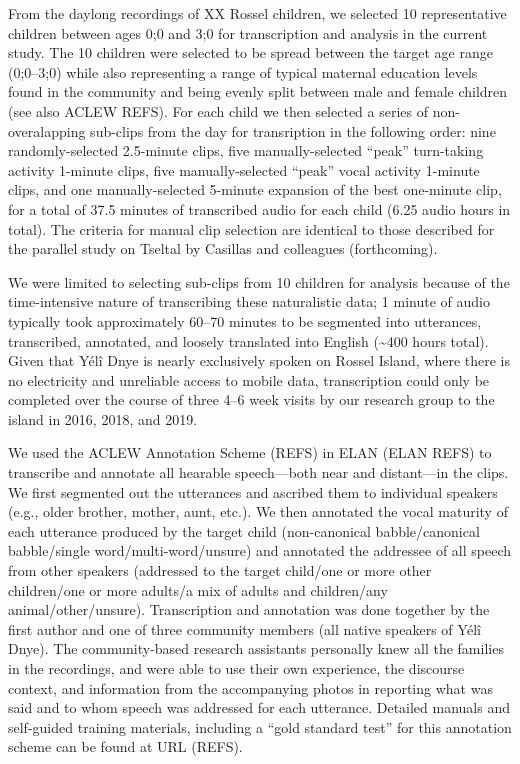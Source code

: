 \documentclass[,man,floatsintext]{apa6}
\begin{document}
From the daylong recordings of XX Rossel children, we selected 10
representative children between ages 0;0 and 3;0 for transcription and
analysis in the current study. The 10 children were selected to be
spread between the target age range (0;0--3;0) while also representing a
range of typical maternal education levels found in the community and
being evenly split between male and female children (see also ACLEW
REFS). For each child we then selected a series of non-overalapping
sub-clips from the day for transription in the following order: nine
randomly-selected 2.5-minute clips, five manually-selected
\enquote{peak} turn-taking activity 1-minute clips, five
manually-selected \enquote{peak} vocal activity 1-minute clips, and one
manually-selected 5-minute expansion of the best one-minute clip, for a
total of 37.5 minutes of transcribed audio for each child (6.25 audio
hours in total). The criteria for manual clip selection are identical to
those described for the parallel study on Tseltal by Casillas and
colleagues (forthcoming).

We were limited to selecting sub-clips from 10 children for analysis
because of the time-intensive nature of transcribing these naturalistic
data; 1 minute of audio typically took approximately 60--70 minutes to
be segmented into utterances, transcribed, annotated, and loosely
translated into English (\textasciitilde{}400 hours total). Given that
Yélî Dnye is nearly exclusively spoken on Rossel Island, where there is
no electricity and unreliable access to mobile data, transcription could
only be completed over the course of three 4--6 week visits by our
research group to the island in 2016, 2018, and 2019.

We used the ACLEW Annotation Scheme (REFS) in ELAN (ELAN REFS) to
transcribe and annotate all hearable speech---both near and distant---in
the clips. We first segmented out the utterances and ascribed them to
individual speakers (e.g., older brother, mother, aunt, etc.). We then
annotated the vocal maturity of each utterance produced by the target
child (non-canonical babble/canonical babble/single
word/multi-word/unsure) and annotated the addressee of all speech from
other speakers (addressed to the target child/one or more other
children/one or more adults/a mix of adults and children/any
animal/other/unsure). Transcription and annotation was done together by
the first author and one of three community members (all native speakers
of Yélî Dnye). The community-based research assistants personally knew
all the families in the recordings, and were able to use their own
experience, the discourse context, and information from the accompanying
photos in reporting what was said and to whom speech was addressed for
each utterance. Detailed manuals and self-guided training materials,
including a \enquote{gold standard test} for this annotation scheme can
be found at URL (REFS).
\end{document}
